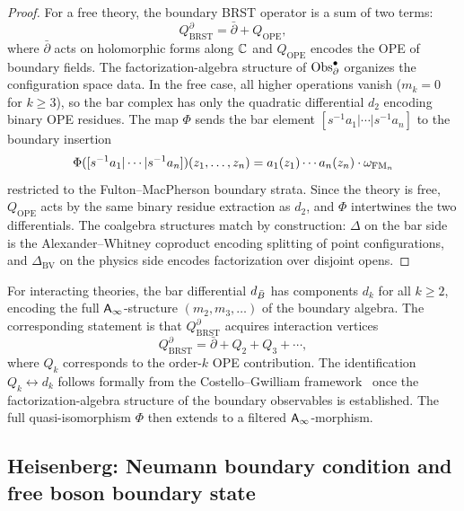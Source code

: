 \begin{proof}
For a free theory, the boundary BRST operator is a sum of two terms:
\[
Q_{\mathrm{BRST}}^\partial = \bar{\partial} + Q_{\mathrm{OPE}},
\]
where $\bar{\partial}$ acts on holomorphic forms along $\mathbb{C}$ and
$Q_{\mathrm{OPE}}$ encodes the OPE of boundary fields. The
factorization-algebra structure of $\operatorname{Obs}^\bullet_\partial$ organizes the
configuration space data. In the free case, all higher operations vanish
($m_k = 0$ for $k \geq 3$), so the bar complex has only the quadratic
differential $d_2$ encoding binary OPE residues. The map $\Phi$ sends
the bar element $[s^{-1}a_1 | \cdots | s^{-1}a_n]$ to the boundary
insertion
\[
\Phi([s^{-1}a_1 | \cdots | s^{-1}a_n])(z_1, \ldots, z_n)
 = a_1(z_1) \cdots a_n(z_n) \cdot \omega_{\operatorname{FM}_n}
\]
restricted to the Fulton--MacPherson boundary strata. Since the theory
is free, $Q_{\mathrm{OPE}}$ acts by the same binary residue extraction
as $d_2$, and $\Phi$ intertwines the two differentials. The coalgebra
structures match by construction: $\Delta$ on the bar side is the
Alexander--Whitney coproduct encoding splitting of point configurations,
and $\Delta_{\mathrm{BV}}$ on the physics side encodes factorization
over disjoint opens.
\end{proof}

\begin{remark}
For interacting theories, the bar differential $d_{\bar{B}}$ has components
$d_k$ for all $k \geq 2$, encoding the full $\mathsf{A}_{\infty}$-structure
$(m_2, m_3, \ldots)$ of the boundary algebra. The corresponding
statement is that $Q_{\mathrm{BRST}}^\partial$ acquires interaction
vertices
\[
Q_{\mathrm{BRST}}^\partial
 = \bar{\partial} + Q_2 + Q_3 + \cdots,
\]
where $Q_k$ corresponds to the order-$k$ OPE contribution. The
identification $Q_k \leftrightarrow d_k$ follows formally from the
Costello--Gwilliam framework~\cite{CG17} once the factorization-algebra
structure of the boundary observables is established. The full
quasi-isomorphism $\Phi$ then extends to a filtered $\mathsf{A}_{\infty}$-morphism.
\end{remark}

\subsection{Heisenberg: Neumann boundary condition and free boson boundary state}

